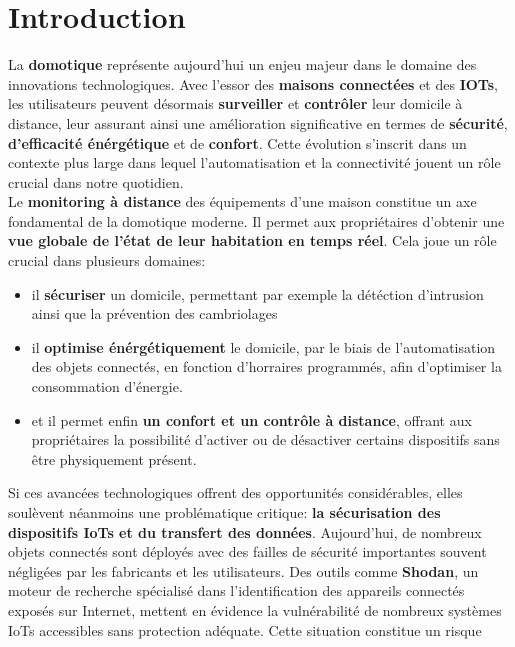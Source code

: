 \documentclass[10pt, a4paper]{report}
\begin{document}
	\chapter{Introduction}
		La \textbf{domotique} représente aujourd'hui un enjeu majeur dans le domaine des innovations technologiques. Avec l'essor des 
		\textbf{maisons connectées} et des \textbf{IOTs}, les utilisateurs peuvent désormais \textbf{surveiller} et \textbf{contrôler} 
		leur domicile à distance, leur assurant ainsi une amélioration significative en termes de \textbf{sécurité}, 
		\textbf{d'efficacité énérgétique} et de \textbf{confort}. Cette évolution s'inscrit dans un contexte plus large dans lequel 
		l'automatisation et la connectivité jouent un rôle crucial dans notre quotidien.\\
		Le \textbf{monitoring à distance} des équipements d'une maison constitue un axe fondamental de la domotique moderne. Il permet 
		aux propriétaires d'obtenir une \textbf{vue globale de l'état de leur habitation en temps réel}. Cela joue un rôle crucial dans 
		plusieurs domaines:
		\begin{itemize}
			\item il \textbf{sécuriser} un domicile, permettant par exemple la détéction d'intrusion ainsi que la prévention 
			des cambriolages
			
			\item il \textbf{optimise énérgétiquement} le domicile, par le biais de l'automatisation des objets 
			connectés, en fonction d'horraires programmés, afin d'optimiser la consommation d'énergie.
			
			\item et il permet enfin \textbf{un confort et un contrôle à distance}, offrant aux propriétaires la possibilité d'activer ou 
			de désactiver certains dispositifs sans être physiquement présent.\\
		\end{itemize}
		Si ces avancées technologiques offrent des opportunités considérables, elles soulèvent néanmoins une problématique critique: 
		\textbf{la sécurisation des dispositifs IoTs et du transfert des données}. Aujourd'hui, de nombreux objets connectés sont 
		déployés avec des failles de sécurité importantes souvent négligées par les fabricants et les utilisateurs. Des outils comme 
		\textbf{Shodan}, un moteur de recherche spécialisé dans l'identification des appareils connectés exposés sur Internet, mettent 
		en évidence la vulnérabilité de nombreux systèmes IoTs accessibles sans protection adéquate. Cette situation constitue un risque 
\end{document}
